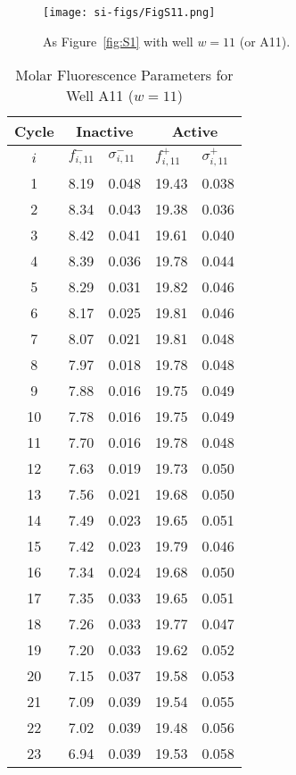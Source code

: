                 \begin{figure}
                    \centering
                    \texttt{[image: si-figs/FigS11.png]}
                    \caption{
                        As Figure~\ref{fig:S1} with well $w=11$ (or A11).
                    }
                \end{figure}
                \clearpage
    \begin{table}
        \caption{Molar Fluorescence Parameters for Well A11 ($w=11$)}
        \centering
        \begin{tabular}{c|ll|ll}
            Cycle & \multicolumn{2}{c|}{Inactive} & \multicolumn{2}{c}{Active} \\
            \hline
            $i$ & $f_{i,11}^{-}$ & $\sigma_{i,11}^{-}$ &  $f_{i,11}^{+}$ & $\sigma_{i,11}^{+}$ \\
            \hline
    1 & 8.19 & 0.048 & 19.43 & 0.038 \\
2 & 8.34 & 0.043 & 19.38 & 0.036 \\
3 & 8.42 & 0.041 & 19.61 & 0.040 \\
4 & 8.39 & 0.036 & 19.78 & 0.044 \\
5 & 8.29 & 0.031 & 19.82 & 0.046 \\
6 & 8.17 & 0.025 & 19.81 & 0.046 \\
7 & 8.07 & 0.021 & 19.81 & 0.048 \\
8 & 7.97 & 0.018 & 19.78 & 0.048 \\
9 & 7.88 & 0.016 & 19.75 & 0.049 \\
10 & 7.78 & 0.016 & 19.75 & 0.049 \\
11 & 7.70 & 0.016 & 19.78 & 0.048 \\
12 & 7.63 & 0.019 & 19.73 & 0.050 \\
13 & 7.56 & 0.021 & 19.68 & 0.050 \\
14 & 7.49 & 0.023 & 19.65 & 0.051 \\
15 & 7.42 & 0.023 & 19.79 & 0.046 \\
16 & 7.34 & 0.024 & 19.68 & 0.050 \\
17 & 7.35 & 0.033 & 19.65 & 0.051 \\
18 & 7.26 & 0.033 & 19.77 & 0.047 \\
19 & 7.20 & 0.033 & 19.62 & 0.052 \\
20 & 7.15 & 0.037 & 19.58 & 0.053 \\
21 & 7.09 & 0.039 & 19.54 & 0.055 \\
22 & 7.02 & 0.039 & 19.48 & 0.056 \\
23 & 6.94 & 0.039 & 19.53 & 0.058 \\

\end{tabular}
\end{table}
